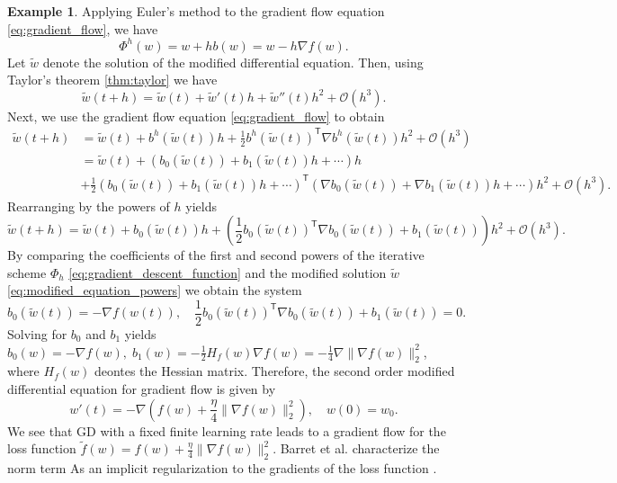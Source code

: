 \documentclass[12pt]{article}
\theoremstyle{definition}
\newtheorem{example}[example]{Example}
\numberwithin{equation}{section}
\newcommand{\CO}{\mathcal{O}}
\newcommand{\T}{\mathsf{T}}
\newcommand{\norm}[1]{\lVert{#1}\rVert_2}
\begin{document}
\begin{example}
Applying Euler's method to the gradient flow equation \eqref{eq:gradient_flow}, we have 
\begin{equation}
  \label{eq:gradient_descent_function}
  \Phi^h(w) = w + h b(w) = w - h \nabla f(w).
\end{equation}
 Let $\widetilde{w}$ denote the solution of the modified differential equation. Then, using Taylor's theorem \autoref{thm:taylor} we have
  \begin{equation*}
    \widetilde{w}(t+h) = \widetilde{w}(t) + \widetilde{w}'(t)h + \widetilde{w}''(t)h^2 + \CO(h^3).
  \end{equation*}
  Next, we use the gradient flow equation \eqref{eq:gradient_flow} to obtain
\begin{align*}
  \widetilde{w}(t+h) &= \widetilde{w}(t) + b^h(\widetilde{w}(t))h + \frac{1}{2}b^h(\widetilde{w}(t))^\T \nabla b^h(\widetilde{w}(t))h^2 + \CO(h^3) \\
  &= \widetilde{w}(t) + (b_0(\widetilde{w}(t)) + b_1(\widetilde{w}(t))h + \cdots)h \\
  &+ \frac{1}{2}(b_0(\widetilde{w}(t)) + b_1(\widetilde{w}(t))h + \cdots)^\T (\nabla b_0(\widetilde{w}(t)) + \nabla b_1(\widetilde{w}(t))h + \cdots)h^2 + \CO(h^3).
\end{align*}
Rearranging by the powers of $h$ yields
\begin{equation}
  \label{eq:modified_equation_powers}
  \widetilde{w}(t+h) = \widetilde{w}(t) + b_0(\widetilde{w}(t))h + \left( \frac{1}{2}b_0(\widetilde{w}(t))^\T \nabla b_0(\widetilde{w}(t)) + b_1(\widetilde{w}(t))\right)h^2 + \CO(h^3). 
\end{equation}
By comparing the coefficients of the first and second powers of the iterative scheme $\Phi_h$ \eqref{eq:gradient_descent_function} and the modified solution $\widetilde{w}$ \eqref{eq:modified_equation_powers} we obtain the system
\begin{equation*}
    b_0(\widetilde{w}(t)) = - \nabla f(w(t)), \quad
    \frac{1}{2}b_0(\widetilde{w}(t))^\T \nabla b_0(\widetilde{w}(t)) + b_1(\widetilde{w}(t)) = 0.
\end{equation*}
Solving for $b_0$ and $b_1$ yields $b_0(w) = -\nabla f(w), \; b_1(w) = - \frac{1}{2} H_f(w)\nabla f(w) = -\frac{1}{4}\nabla\norm{\nabla f(w)}^2$, where $H_f(w)$ deontes the Hessian matrix. Therefore, the second order modified differential equation for gradient flow is given by
\begin{equation}
  \label{eq:second_order_ode}
  w'(t) = -\nabla\left(f(w) + \frac{\eta}{4}\norm{\nabla f(w)}^2\right),\quad w(0) = w_0.
\end{equation}
We see that GD with a fixed finite learning rate leads to a gradient flow for the loss function $\widetilde{f}(w) = f(w) + \frac{\eta}{4}\norm{\nabla f(w)}^2$. Barret et al. characterize the norm term As an implicit regularization to the gradients of the loss function \cite{barrettImplicitGradientRegularization2021}.
\end{example}
\end{document}
